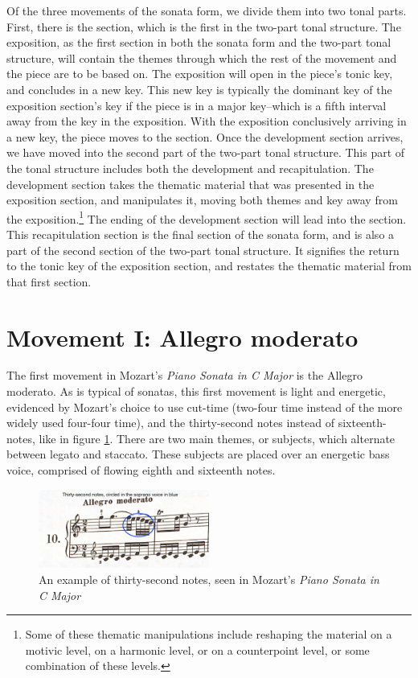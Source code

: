 Of the three movements of the sonata form, we divide them into two tonal parts. First, there is the  section, which is the first in the two-part tonal structure. The exposition, as the first section in both the sonata form and the two-part tonal structure, will contain the themes through which the rest of the movement and the piece are to be based on. The exposition will open in the piece's tonic key, and concludes in a new key. This new key is typically the dominant key of the exposition section's key if the piece is in a major key\autocite{Webster_2001}--which is a fifth interval away from the key in the exposition. With the exposition conclusively arriving in a new key, the piece moves to the  section. Once the development section arrives, we have moved into the second part of the two-part tonal structure. This part of the tonal structure includes both the development and recapitulation\autocite{Webster_2001}. The development section takes the thematic material that was presented in the exposition section, and manipulates it, moving both themes and key away from the exposition.\footnote{Some of these thematic manipulations include reshaping the material on a motivic level, on a harmonic level, or on a counterpoint level, or some combination of these levels.} The ending of the development section will lead into the  section. This recapitulation section is the final section of the sonata form, and is also a part of the second section of the two-part tonal structure. It signifies the return to the tonic key of the exposition section\autocite{Webster_2001}, and restates the thematic material from that first section.

\section{Movement I: Allegro moderato}
The first movement in Mozart's \textit{Piano Sonata in C Major} is the Allegro moderato. As is typical of sonatas, this first movement is light and energetic, evidenced by Mozart's choice to use cut-time (two-four time instead of the more widely used four-four time), and the thirty-second notes instead of sixteenth-notes, like in figure \ref{fig:mozart-thirty-second-notes}\autocite{Henle_1977}. There are two main themes, or subjects, which alternate between legato and staccato. These subjects are placed over an energetic bass voice, comprised of flowing eighth and sixteenth notes.

\begin{figure}
    \centering
    \includegraphics[width=0.5\textwidth]{figures/mozart-thirty-second-notes.jpg}
    \caption{An example of thirty-second notes, seen in Mozart's \textit{Piano Sonata in C Major}}
    \label{fig:mozart-thirty-second-notes}
\end{figure}

